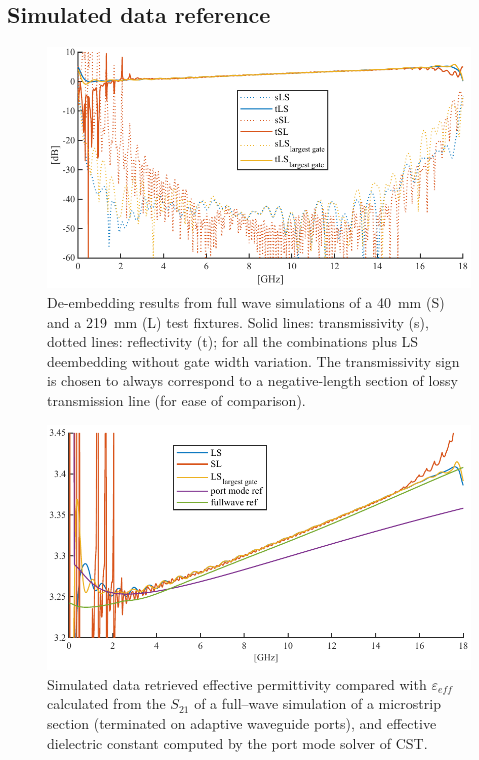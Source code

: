 \documentclass[11pt,a4paper]{article}
\begin{document}
    \subsection{Simulated data reference}
    \label{subsec:simulation}
    \begin{figure}[!t]
        \includegraphics[width=\textwidth]{sparasim}
        \caption{De-embedding results from full wave simulations of a 40~mm (S) and a 219~mm (L) test fixtures.
        Solid lines: transmissivity (s), dotted lines: reflectivity (t); for all the combinations plus LS deembedding
        without gate width variation. The transmissivity sign is chosen to always correspond to a negative-length section
        of lossy transmission line (for ease of comparison).}
        \label{fig:sparasim}
    \end{figure}
    \begin{figure}[!tb]
        \includegraphics[width=\textwidth]{epsisim}
        \caption{Simulated data retrieved effective permittivity compared with $\varepsilon_{eff}$ calculated from
        the $S_{21}$ of a full--wave simulation of a microstrip section (terminated on adaptive waveguide ports),
            and effective dielectric constant computed by the port mode solver of CST.}
        \label{fig:epsilonsim}
    \end{figure}
\end{document}
